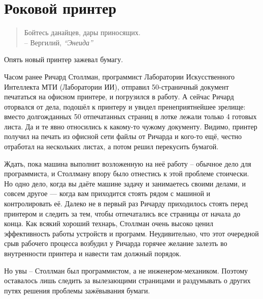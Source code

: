 
\chapter{Роковой принтер}

\begin{quotation}
  \begin{flushright}
    Бойтесь данайцев, дары приносящих.\\
    -- Вергилий, \textit{\enquote{Энеида}}
  \end{flushright}
\end{quotation}

Опять новый принтер зажевал бумагу.

Часом ранее Ричард Столлман, программист Лаборатории Искусственного Интеллекта МТИ (Лаборатории ИИ), отправил 50-страничный документ печататься на офисном принтере, и погрузился в работу. А сейчас Ричард оторвался от дела, подошёл к принтеру и увидел пренеприятнейшее зрелище: вместо долгожданных 50 отпечатанных страниц в лотке лежали только 4 готовых листа. Да и те явно относились к какому-то чужому документу. Видимо, принтер получил на печать из офисной сети файлы от Ричарда и кого-то ещё, честно отработал на нескольких листах, а потом решил перекусить бумагой.

Ждать, пока машина выполнит возложенную на неё работу -- обычное дело для программиста, и Столлману впору было отнестись к этой проблеме стоически. Но одно дело, когда вы даёте машине задачу и занимаетесь своими делами, и совсем другое — когда вам приходится стоять рядом с машиной и контролировать её. Далеко не в первый раз Ричарду приходилось стоять перед принтером и следить за тем, чтобы отпечатались все страницы от начала до конца. Как всякий хороший технарь, Столлман очень высоко ценил эффективность работы устройств и программ. Неудивительно, что этот очередной срыв рабочего процесса возбудил у Ричарда горячее желание залезть во внутренности принтера и навести там должный порядок.

Но увы -- Столлман был программистом, а не инженером-механиком. Поэтому оставалось лишь следить за вылезающими страницами и раздумывать о других путях решения проблемы зажёвывания бумаги.

